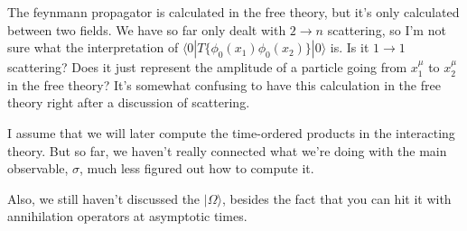 \documentclass{article}
\begin{document}
The feynmann propagator is calculated in the free theory, but it's only calculated between
	two fields.
We have so far only dealt with $2 \to n$ scattering, so I'm not sure what the interpretation
	of $\langle 0 | T \{ \phi_0(x_1) \phi_0(x_2) \} | 0 \rangle $ is.
Is it $1 \to 1$ scattering?
Does it just represent the amplitude of a particle going from $x_1^\mu$ to $x_2^\mu$ in the
	free theory?
It's somewhat confusing to have this calculation in the free theory right after a discussion
	of scattering.

I assume that we will later compute the time-ordered products in the interacting theory.
But so far, we haven't really connected what we're doing with the main observable, $\sigma$,
	much less figured out how to compute it.

Also, we still haven't discussed the $| \Omega \rangle$, besides the fact that you can hit 
	it with annihilation operators at asymptotic times.
\end{document}
